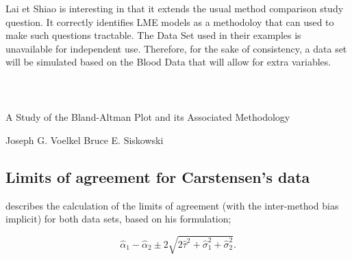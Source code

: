 \documentclass[]{article}
\begin{document}

Lai et Shiao is interesting in that it extends the usual method comparison study question. It correctly identifies LME models as a methodoloy that can used to make such questions tractable.
The Data Set used in their examples is unavailable for independent use. Therefore, for the sake of consistency, a data set will be simulated based on the Blood Data that will allow for extra variables.

\begin{framed}
	\begin{verbatim}
	
	
	\end{verbatim}
\end{framed}






A Study of the Bland-Altman Plot and its Associated Methodology

Joseph G. Voelkel Bruce E. Siskowski 



\subsection{Limits of agreement for Carstensen's data}


\citet{bxc2008} describes the calculation of the limits of agreement (with the inter-method bias implicit) for both data sets, based on his formulation;

\[\hat{\alpha}_1 - \hat{\alpha}_2 \pm 2\sqrt{2\hat{\tau}^2 +\hat{\sigma}_1^2 +\hat{\sigma}_2^2 }.\]
\end{document}
